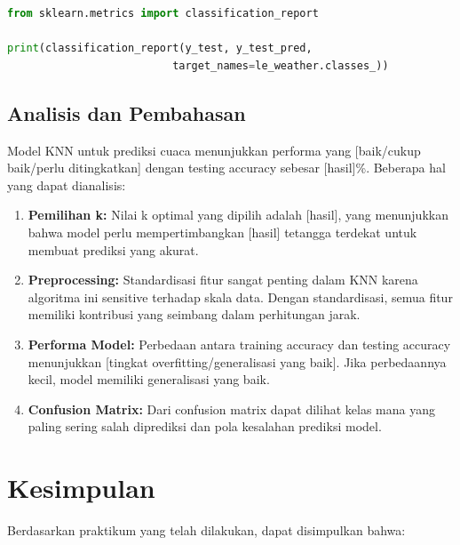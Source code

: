\documentclass[12pt,a4paper]{article}
\begin{document}
\begin{lstlisting}[language=Python, caption=Classification Report]
from sklearn.metrics import classification_report

print(classification_report(y_test, y_test_pred, 
                          target_names=le_weather.classes_))
\end{lstlisting}

\subsection{Analisis dan Pembahasan}
Model KNN untuk prediksi cuaca menunjukkan performa yang [baik/cukup baik/perlu ditingkatkan] dengan testing accuracy sebesar [hasil]\%. Beberapa hal yang dapat dianalisis:

\begin{enumerate}
    \item \textbf{Pemilihan k:} Nilai k optimal yang dipilih adalah [hasil], yang menunjukkan bahwa model perlu mempertimbangkan [hasil] tetangga terdekat untuk membuat prediksi yang akurat.
    
    \item \textbf{Preprocessing:} Standardisasi fitur sangat penting dalam KNN karena algoritma ini sensitive terhadap skala data. Dengan standardisasi, semua fitur memiliki kontribusi yang seimbang dalam perhitungan jarak.
    
    \item \textbf{Performa Model:} Perbedaan antara training accuracy dan testing accuracy menunjukkan [tingkat overfitting/generalisasi yang baik]. Jika perbedaannya kecil, model memiliki generalisasi yang baik.
    
    \item \textbf{Confusion Matrix:} Dari confusion matrix dapat dilihat kelas mana yang paling sering salah diprediksi dan pola kesalahan prediksi model.
\end{enumerate}

\section{Kesimpulan}

Berdasarkan praktikum yang telah dilakukan, dapat disimpulkan bahwa:
\end{document}
